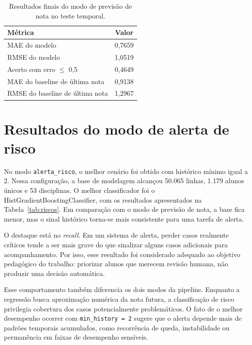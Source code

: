 \begin{table}[ht]
\caption{Resultados finais do modo de previs\~ao de nota no teste temporal.}
\label{tab:prevnota}
\centering
\begin{tabular}{l c}
\hline
\textbf{M\'etrica} & \textbf{Valor} \\
\hline
MAE do modelo & 0,7659 \\
RMSE do modelo & 1,0519 \\
Acerto com erro $\leq$ 0,5 & 0,4649 \\
MAE do baseline de \'ultima nota & 0,9138 \\
RMSE do baseline de \'ultima nota & 1,2967 \\
\hline
\end{tabular}
\par\smallskip{}\par
\end{table}

\section{Resultados do modo de alerta de risco}
\label{sec:alerta-risco}

No modo \texttt{alerta\_risco}, o melhor cen\'ario foi obtido com hist\'orico m\'inimo igual a 2. Nessa configura\c{c}\~ao, a base de modelagem alcan\c{c}ou 50.065 linhas, 1.179 alunos \'unicos e 53 disciplinas. O melhor classificador foi o HistGradientBoostingClassifier, com os resultados apresentados na Tabela~\ref{tab:riscos}. Em compara\c{c}\~ao com o modo de previs\~ao de nota, a base fica menor, mas o sinal hist\'orico torna-se mais consistente para uma tarefa de alerta.

O destaque est\'a no \textit{recall}. Em um sistema de alerta, perder casos realmente cr\'iticos tende a ser mais grave do que sinalizar alguns casos adicionais para acompanhamento. Por isso, esse resultado foi considerado adequado ao objetivo pedag\'ogico do trabalho: priorizar alunos que merecem revis\~ao humana, n\~ao produzir uma decis\~ao autom\'atica.

Esse comportamento tamb\'em diferencia os dois modos da pipeline. Enquanto a regress\~ao busca aproxima\c{c}\~ao num\'erica da nota futura, a classifica\c{c}\~ao de risco privilegia cobertura dos casos potencialmente problem\'aticos. O fato de o melhor desempenho ocorrer com \texttt{min\_history = 2} sugere que o alerta depende mais de padr\~oes temporais acumulados, como recorr\^encia de queda, instabilidade ou perman\^encia em faixas de desempenho sens\'iveis.

